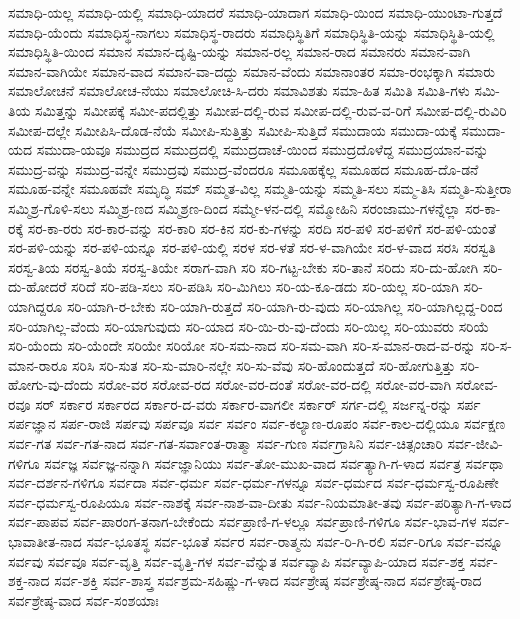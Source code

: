 ಸಮಾಧಿ-ಯಲ್ಲ
ಸಮಾಧಿ-ಯಲ್ಲಿ
ಸಮಾಧಿ-ಯಾದರೆ
ಸಮಾಧಿ-ಯಾದಾಗ
ಸಮಾಧಿ-ಯಿಂದ
ಸಮಾಧಿ-ಯುಂಟಾ-ಗುತ್ತದೆ
ಸಮಾಧಿ-ಯೆಂದು
ಸಮಾಧಿಸ್ಥ-ನಾಗಲು
ಸಮಾಧಿಸ್ಥ-ರಾದರು
ಸಮಾಧಿಸ್ಥಿತಿಗೆ
ಸಮಾಧಿಸ್ಥಿತಿ-ಯನ್ನು
ಸಮಾಧಿಸ್ಥಿತಿ-ಯಲ್ಲಿ
ಸಮಾಧಿಸ್ಥಿತಿ-ಯಿಂದ
ಸಮಾನ
ಸಮಾನ-ದೃಷ್ಟಿ-ಯನ್ನು
ಸಮಾನ-ರಲ್ಲ
ಸಮಾನ-ರಾದ
ಸಮಾನರು
ಸಮಾನ-ವಾಗಿ
ಸಮಾನ-ವಾಗಿಯೇ
ಸಮಾನ-ವಾದ
ಸಮಾನ-ವಾ-ದದ್ದು
ಸಮಾನ-ವೆಂದು
ಸಮಾನಾಂತರ
ಸಮಾ-ರಂಭಕ್ಕಾಗಿ
ಸಮಾರು
ಸಮಾಲೋಚನೆ
ಸಮಾಲೋಚ-ನೆಯು
ಸಮಾಲೋಚಿ-ಸಿ-ದರು
ಸಮಾವಿಶತು
ಸಮಾ-ಹಿತ
ಸಮಿತಿ
ಸಮಿತಿ-ಗಳು
ಸಮಿ-ತಿಯ
ಸಮಿತ್ತನ್ನು
ಸಮೀಪಕ್ಕೆ
ಸಮೀ-ಪದಲ್ಲಿತ್ತು
ಸಮೀಪ-ದಲ್ಲಿ-ರುವ
ಸಮೀಪ-ದಲ್ಲಿ-ರುವ-ವ-ರಿಗೆ
ಸಮೀಪ-ದಲ್ಲಿ-ರುವಿರಿ
ಸಮೀಪ-ದಲ್ಲೇ
ಸಮೀಪಿಸಿ-ದೊಡ-ನೆಯೆ
ಸಮೀಪಿ-ಸುತ್ತಿತ್ತು
ಸಮೀಪಿ-ಸುತ್ತಿದೆ
ಸಮುದಾಯ
ಸಮುದಾ-ಯಕ್ಕೆ
ಸಮುದಾ-ಯದ
ಸಮುದಾ-ಯವೂ
ಸಮುದ್ರದ
ಸಮುದ್ರದಲ್ಲಿ
ಸಮುದ್ರದಾಚೆ-ಯಿಂದ
ಸಮುದ್ರದೊಳೆದ್ದ
ಸಮುದ್ರಯಾನ-ವನ್ನು
ಸಮುದ್ರ-ವನ್ನು
ಸಮುದ್ರ-ವನ್ನೇ
ಸಮುದ್ರವು
ಸಮುದ್ರ-ವೆಂದರೂ
ಸಮೂಹಕ್ಕೆಲ್ಲ
ಸಮೂಹದ
ಸಮೂಹ-ದೊ-ಡನೆ
ಸಮೂಹ-ವನ್ನೇ
ಸಮೂಹವೇ
ಸಮೃದ್ಧಿ
ಸಮ್
ಸಮ್ಮತ-ವಿಲ್ಲ
ಸಮ್ಮತಿ-ಯನ್ನು
ಸಮ್ಮತಿ-ಸಲು
ಸಮ್ಮ-ತಿಸಿ
ಸಮ್ಮತಿ-ಸುತ್ತೀರಾ
ಸಮ್ಮಿಶ್ರ-ಗೊಳಿ-ಸಲು
ಸಮ್ಮಿಶ್ರ-ಣದ
ಸಮ್ಮಿಶ್ರಣ-ದಿಂದ
ಸಮ್ಮೇ-ಳನ-ದಲ್ಲಿ
ಸಮ್ಮೋಹಿನಿ
ಸರಂಜಾಮು-ಗಳನ್ನೆಲ್ಲಾ
ಸರ-ಕಾ-ರಕ್ಕೆ
ಸರ-ಕಾ-ರರು
ಸರ-ಕಾರ-ವನ್ನು
ಸರ-ಕಾರಿ
ಸರ-ಕಿನ
ಸರ-ಕು-ಗಳನ್ನು
ಸರದಿ
ಸರ-ಪಳಿ
ಸರ-ಪಳಿಗೆ
ಸರ-ಪಳಿ-ಯಂತೆ
ಸರ-ಪಳಿ-ಯನ್ನು
ಸರ-ಪಳಿ-ಯನ್ನೂ
ಸರ-ಪಳಿ-ಯಲ್ಲಿ
ಸರಳ
ಸರ-ಳತೆ
ಸರ-ಳ-ವಾಗಿಯೇ
ಸರ-ಳ-ವಾದ
ಸರಸಿ
ಸರಸ್ವತಿ
ಸರಸ್ವ-ತಿಯ
ಸರಸ್ವ-ತಿಯೆ
ಸರಸ್ವ-ತಿಯೇ
ಸರಾಗ-ವಾಗಿ
ಸರಿ
ಸರಿ-ಗಟ್ಟ-ಬೇಕು
ಸರಿ-ತಾನೆ
ಸರಿದು
ಸರಿ-ದು-ಹೋಗಿ
ಸರಿ-ದು-ಹೋದರೆ
ಸರಿದೆ
ಸರಿ-ಪಡಿ-ಸಲು
ಸರಿ-ಪಡಿಸಿ
ಸರಿ-ಮಿಗಿಲು
ಸರಿ-ಯ-ಕೂ-ಡದು
ಸರಿ-ಯಲ್ಲ
ಸರಿ-ಯಾಗಿ
ಸರಿ-ಯಾಗಿದ್ದರೂ
ಸರಿ-ಯಾಗಿ-ರ-ಬೇಕು
ಸರಿ-ಯಾಗಿ-ರುತ್ತದೆ
ಸರಿ-ಯಾಗಿ-ರು-ವುದು
ಸರಿ-ಯಾಗಿಲ್ಲ
ಸರಿ-ಯಾಗಿಲ್ಲದ್ದ-ರಿಂದ
ಸರಿ-ಯಾಗಿಲ್ಲ-ವೆಂದು
ಸರಿ-ಯಾಗುವುದು
ಸರಿ-ಯಾದ
ಸರಿ-ಯಿ-ರು-ವು-ದೆಂದು
ಸರಿ-ಯಿಲ್ಲ
ಸರಿ-ಯುವರು
ಸರಿಯೆ
ಸರಿ-ಯೆಂದು
ಸರಿ-ಯೆಂದೇ
ಸರಿಯೇ
ಸರಿಯೋ
ಸರಿ-ಸಮ-ನಾದ
ಸರಿ-ಸಮ-ವಾಗಿ
ಸರಿ-ಸ-ಮಾನ-ರಾದ-ವ-ರನ್ನು
ಸರಿ-ಸ-ಮಾನ-ರಾರೂ
ಸರಿಸಿ
ಸರಿ-ಸುತ
ಸರಿ-ಸು-ಮಾರಿ-ನಲ್ಲೇ
ಸರಿ-ಸು-ವೆವು
ಸರಿ-ಹೊಂದುತ್ತದೆ
ಸರಿ-ಹೋಗುತ್ತಿತ್ತು
ಸರಿ-ಹೋಗು-ವು-ದೆಂದು
ಸರೋ-ವರ
ಸರೋವ-ರದ
ಸರೋ-ವರ-ದಂತೆ
ಸರೋ-ವರ-ದಲ್ಲಿ
ಸರೋ-ವರ-ವಾಗಿ
ಸರೋವ-ರವೂ
ಸರ್
ಸರ್ಕಾರ
ಸರ್ಕಾರದ
ಸರ್ಕಾರ-ದ-ವರು
ಸರ್ಕಾರ-ವಾಗಲೀ
ಸರ್ಕಾರ್
ಸರ್ಗ-ದಲ್ಲಿ
ಸರ್ಜನ್ನ-ರನ್ನು
ಸರ್ಪ
ಸರ್ಪಜ್ಞಾನ
ಸರ್ಪ-ರಾಜಿ
ಸರ್ಪವು
ಸರ್ಪವೂ
ಸರ್ವ
ಸರ್ವಂ
ಸರ್ವ-ಕಲ್ಯಾಣ-ರೂಪಂ
ಸರ್ವ-ಕಾಲ-ದಲ್ಲಿಯೂ
ಸರ್ವಕ್ಷಣ
ಸರ್ವ-ಗತ
ಸರ್ವ-ಗತ-ನಾದ
ಸರ್ವ-ಗತ-ಸರ್ವಾಂತ-ರಾತ್ಮಾ
ಸರ್ವ-ಗುಣ
ಸರ್ವಗ್ರಾಸಿನಿ
ಸರ್ವ-ಚಿತ್ಸಂಚಾರಿ
ಸರ್ವ-ಜೀವಿ-ಗಳಿಗೂ
ಸರ್ವಜ್ಞ
ಸರ್ವಜ್ಞ-ನನ್ನಾಗಿ
ಸರ್ವಜ್ಞಾನಿಯು
ಸರ್ವ-ತೋ-ಮುಖ-ವಾದ
ಸರ್ವತ್ಯಾಗಿ-ಗ-ಳಾದ
ಸರ್ವತ್ರ
ಸರ್ವಥಾ
ಸರ್ವ-ದರ್ಶನ-ಗಳಿಗೂ
ಸರ್ವದಾ
ಸರ್ವ-ಧರ್ಮ
ಸರ್ವ-ಧರ್ಮ-ಗಳನ್ನೂ
ಸರ್ವ-ಧರ್ಮದ
ಸರ್ವ-ಧರ್ಮಸ್ವ-ರೂಪಿಣೇ
ಸರ್ವ-ಧರ್ಮಸ್ವ-ರೂಪಿಯೂ
ಸರ್ವ-ನಾಶಕ್ಕೆ
ಸರ್ವ-ನಾಶ-ವಾ-ದೀತು
ಸರ್ವ-ನಿಯಮಾತೀ-ತವು
ಸರ್ವ-ಪರಿತ್ಯಾಗಿ-ಗ-ಳಾದ
ಸರ್ವ-ಪಾಪವ
ಸರ್ವ-ಪಾರಂಗ-ತನಾಗ-ಬೇಕೆಂದು
ಸರ್ವಪ್ರಾಣಿ-ಗ-ಳಲ್ಲೂ
ಸರ್ವಪ್ರಾಣಿ-ಗಳಿಗೂ
ಸರ್ವ-ಭಾವ-ಗಳ
ಸರ್ವ-ಭಾವಾತೀತ-ನಾದ
ಸರ್ವ-ಭೂತಸ್ಥ
ಸರ್ವ-ಭೂತೆ
ಸರ್ವರ
ಸರ್ವ-ರಾತ್ಮನು
ಸರ್ವ-ರಿ-ಗಿ-ರಲಿ
ಸರ್ವ-ರಿಗೂ
ಸರ್ವ-ವನ್ನೂ
ಸರ್ವವು
ಸರ್ವವೂ
ಸರ್ವ-ವೃತ್ತಿ
ಸರ್ವ-ವೃತ್ತಿ-ಗಳ
ಸರ್ವ-ವೆನ್ನುತ
ಸರ್ವವ್ಯಾಪಿ
ಸರ್ವವ್ಯಾಪಿ-ಯಾದ
ಸರ್ವ-ಶಕ್ತ
ಸರ್ವ-ಶಕ್ತ-ನಾದ
ಸರ್ವ-ಶಕ್ತಿ
ಸರ್ವ-ಶಾಸ್ತ್ರ
ಸರ್ವಶ್ರಮ-ಸಹಿಷ್ಣು-ಗ-ಳಾದ
ಸರ್ವಶ್ರೇಷ್ಠ
ಸರ್ವಶ್ರೇಷ್ಠ-ನಾದ
ಸರ್ವಶ್ರೇಷ್ಠ-ರಾದ
ಸರ್ವಶ್ರೇಷ್ಠ-ವಾದ
ಸರ್ವ-ಸಂಶಯಾಃ
